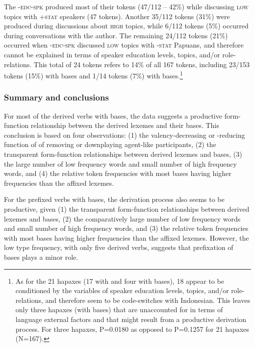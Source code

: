 The \textsc{-edc-spk} produced most of their tokens (47/112 – 42\%) while discussing \textsc{low} topics with \textsc{+stat} speakers (47 tokens). Another 35/112 tokens (31\%) were produced during discussions about \textsc{high} topics, while 6/112 tokens (5\%) occurred during conversations with the author. The remaining 24/112 tokens (21\%) occurred when \textsc{-edc-spk} discussed \textsc{low} topics with \textsc{-stat} Papuans, and therefore cannot be explained in terms of speaker education levels, topics, and/or role-relations. This total of 24 tokens refers to 14\% of all 167 tokens, including 23/153 tokens (15\%) with  bases and 1/14 tokens (7\%) with  bases.\footnote{As for the 21 hapaxes (17 with  and four with  bases), 18 appear to be conditioned by the variables of speaker education levels, topics, and/or role-relations, and therefore seem to be code-switches with Indonesian. This leaves only three hapaxes (with  bases) that are unaccounted for in terms of language external factors and that might result from a productive derivation process. For three hapaxes, P=0.0180 as opposed to P=0.1257 for 21 hapaxes (N=167).}


\subsubsection[Summary and conclusions]{Summary and conclusions}\label{Para_3.1.2.5}
For most of the derived verbs with  bases, the data suggests a productive form-function relationship between the derived lexemes and their bases. This conclusion is based on four observations: (1) the valency-decreasing or -reducing function of  of removing or downplaying agent-like participants, (2) the transparent form-function relationships between derived lexemes and bases, (3) the large number of low frequency words and small number of high frequency words, and (4) the relative token frequencies with most bases having higher frequencies than the affixed lexemes.



For the prefixed verbs with  bases, the derivation process also seems to be productive, given (1) the transparent form-function relationships between derived lexemes and bases, (2) the comparatively large number of low frequency words and small number of high frequency words, and (3) the relative token frequencies with most bases having higher frequencies than the affixed lexemes. However, the low type frequency, with only five derived verbs, suggests that prefixation of  bases plays a minor role.



